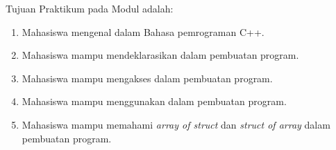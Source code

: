 \documentclass[../main.tex]{subfiles}
\begin{document}
    \noindent Tujuan Praktikum pada Modul {} {\leftmark} adalah:
    \begin{enumerate}
        \item Mahasiswa mengenal {\struct} dalam Bahasa pemrograman C++.
        \item Mahasiswa mampu mendeklarasikan {\struct} dalam pembuatan program.
        \item Mahasiswa mampu mengakses {\struct} dalam pembuatan program.
        \item Mahasiswa mampu menggunakan {\nested} {\struct} dalam pembuatan program.
        \item Mahasiswa mampu memahami \textit{array of struct} dan \textit{struct of array} dalam pembuatan program.
    \end{enumerate}
\end{document}
